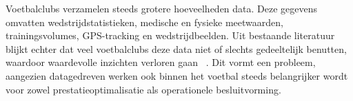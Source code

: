 




Voetbalclubs verzamelen steeds grotere hoeveelheden data. Deze gegevens omvatten wedstrijdstatistieken, medische en fysieke meetwaarden, trainingsvolumes, GPS-tracking en wedstrijdbeelden.
Uit bestaande literatuur blijkt echter dat veel voetbalclubs deze data niet of slechts gedeeltelijk benutten, waardoor waardevolle inzichten verloren gaan ~\autocite{Fried2016}.
Dit vormt een probleem, aangezien datagedreven werken ook binnen het voetbal steeds belangrijker wordt voor zowel prestatieoptimalisatie als operationele besluitvorming.

